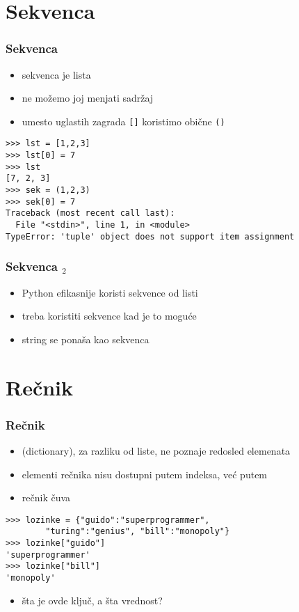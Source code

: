 \documentclass[utf8,compress]{beamer}
\begin{document}
\section[Sekvenca]{Sekvenca}

\begin{frame}[fragile]
  \frametitle{Sekvenca}
  \begin{itemize}
    \item sekvenca je  lista
    \item ne možemo joj menjati sadržaj
    \item umesto uglastih zagrada \texttt{[]} koristimo obične \texttt{()}
  \end{itemize}
\begin{verbatim}
>>> lst = [1,2,3]
>>> lst[0] = 7
>>> lst
[7, 2, 3]
>>> sek = (1,2,3)
>>> sek[0] = 7
Traceback (most recent call last):
  File "<stdin>", line 1, in <module>
TypeError: 'tuple' object does not support item assignment
\end{verbatim}
\end{frame}

\begin{frame}[fragile]
  \frametitle{Sekvenca $_2$}
  \begin{itemize}
    \item Python efikasnije koristi sekvence od listi
    \item treba koristiti sekvence kad je to moguće
    \item string se ponaša kao sekvenca
  \end{itemize}
\end{frame}


\section[Rečnik]{Rečnik}

\begin{frame}[fragile]
  \frametitle{Rečnik}
  \begin{itemize}
    \item {} (dictionary), za razliku od liste, ne poznaje redosled elemenata
    \item elementi rečnika nisu dostupni putem indeksa, već putem 
    \item rečnik čuva 
  \end{itemize}
\begin{verbatim}
>>> lozinke = {"guido":"superprogrammer", 
        "turing":"genius", "bill":"monopoly"}
>>> lozinke["guido"]
'superprogrammer'
>>> lozinke["bill"]
'monopoly'
\end{verbatim}
  \begin{itemize}
    \item šta je ovde ključ, a šta vrednost?
  \end{itemize}
\end{frame}
\end{document}
